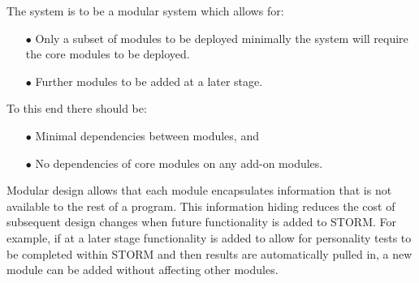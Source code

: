\begin{flushleft}
The system is to be a modular system which allows for:
\end{flushleft}

\begin{itemize} 
\item[$\bullet$] Only a subset of modules to be deployed minimally the system will require the core modules to be deployed.
\item[$\bullet$] Further modules to be added at a later stage.
\end{itemize}

\begin{flushleft}
To this end there should be:
\end{flushleft}

\begin{itemize} 
\item[$\bullet$] Minimal dependencies between modules, and
\item[$\bullet$] No dependencies of core modules on any add-on modules.
\end{itemize}

\begin{flushleft}
Modular design allows that each module encapsulates information that is not available to the rest of a program. This information hiding reduces the cost of subsequent design changes when future functionality is added to STORM. For example, if at a later stage functionality is added to allow for personality tests to be completed within STORM and then results are automatically pulled in, a new module can be added without affecting other modules.
\end{flushleft}